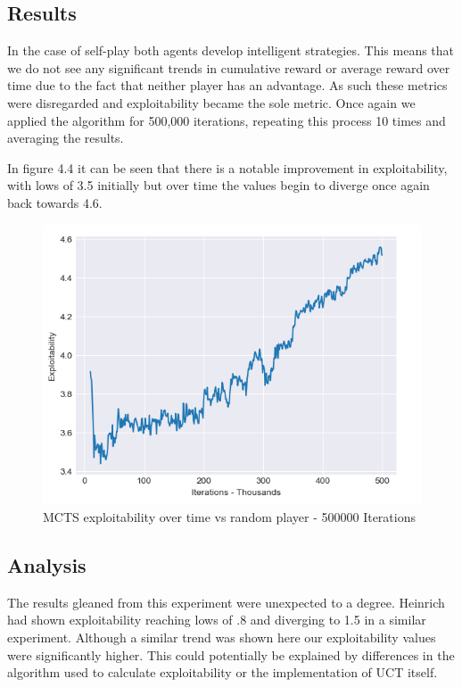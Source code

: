 \subsection{Results}\label{subsec:results2}
In the case of self-play both agents develop intelligent strategies.
This means that we do not see any significant trends in cumulative reward or average reward over time
due to the fact that neither player has an advantage.
As such these metrics were disregarded and exploitability became the sole metric.
Once again we applied the algorithm for 500,000 iterations, repeating this process 10 times
and averaging the results.

In figure 4.4 it can be seen that there is a notable improvement in exploitability, with lows of 3.5 initially
but over time the values begin to diverge once again back towards 4.6.

\begin{figure}[ht]
    \includegraphics[scale=.7]{images/exploitability_self-play_deterministic_500000.png}
    \caption{MCTS exploitability over time vs random player - 500000 Iterations}
\end{figure}

\subsection{Analysis}\label{subsec:analysis2}
The results gleaned from this experiment were unexpected to a degree.
Heinrich had shown exploitability reaching lows of .8 and diverging to 1.5 in a similar experiment.
Although a similar trend was shown here our exploitability values were significantly higher.
This could potentially be explained by differences in the algorithm used to calculate exploitability
or the implementation of UCT itself.

